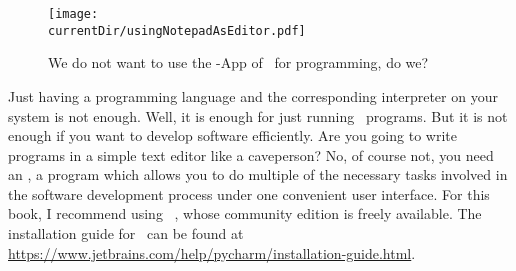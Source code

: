 %
\label{sec:installingPyCharm}%
%
\begin{figure}%
\centering%
\texttt{[image: \\currentDir/usingNotepadAsEditor.pdf]}%
\caption{We do not want to use the \nobreakdashes-App of \microsoftWindows\ for programming, do we?}%
\label{fig:usingNotepadAsEditor}%
\end{figure}%
%
Just having a programming language and the corresponding interpreter on your system is not enough.
Well, it is enough for just running \python\ programs.
But it is not enough if you want to develop software efficiently.
Are you going to write programs in a simple text editor like a caveperson?
No, of course not, you need an , a program which allows you to do multiple of the necessary tasks involved in the software development process under one convenient user interface.
For this book, I recommend using \pycharm~\cite{VHN2023HOADWP,Y2022PPADT,W2024PME}, whose community edition is freely available.
The installation guide for \pycharm\ can be found at \url{https://www.jetbrains.com/help/pycharm/installation-guide.html}.%
%
%
%
\endhsection%
%
